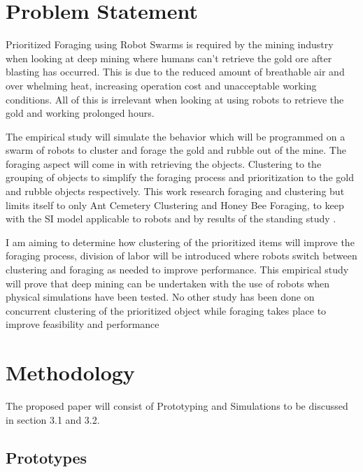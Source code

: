 \documentclass[12pt]{article}
\begin{document}
\section{Problem Statement}

\par{Prioritized Foraging using Robot Swarms is required by the mining industry when looking at deep mining where humans can't retrieve the gold ore after blasting has occurred. This is due to the reduced amount of breathable air and over whelming heat, increasing operation cost and unacceptable working conditions. All of this is irrelevant when looking at using robots to retrieve the gold and working prolonged hours.} 
\\
\par{The empirical study will simulate the behavior which will be programmed on a swarm of robots to cluster and forage the gold and rubble out of the mine. The foraging aspect will come in with retrieving the objects. Clustering to the grouping of objects to simplify the foraging process and prioritization to the gold and rubble objects respectively. This work research foraging and clustering but limits itself to only Ant Cemetery Clustering and Honey Bee Foraging, to keep with the SI model applicable to robots and by results of the standing study \cite{Jade-2014}.}
\\
\par{I am aiming to determine how clustering of the prioritized items will improve the foraging process, division of labor will be introduced where robots switch between clustering and foraging as needed to improve performance. This empirical study will prove that deep mining can be undertaken with the use of robots when physical simulations have been tested. No other study has been done on concurrent clustering of the prioritized object while foraging takes place to improve feasibility and performance}

\section{Methodology}

\par{The proposed paper will consist of Prototyping and Simulations to be discussed in section 3.1 and 3.2.}

\subsection{Prototypes}
\end{document}
